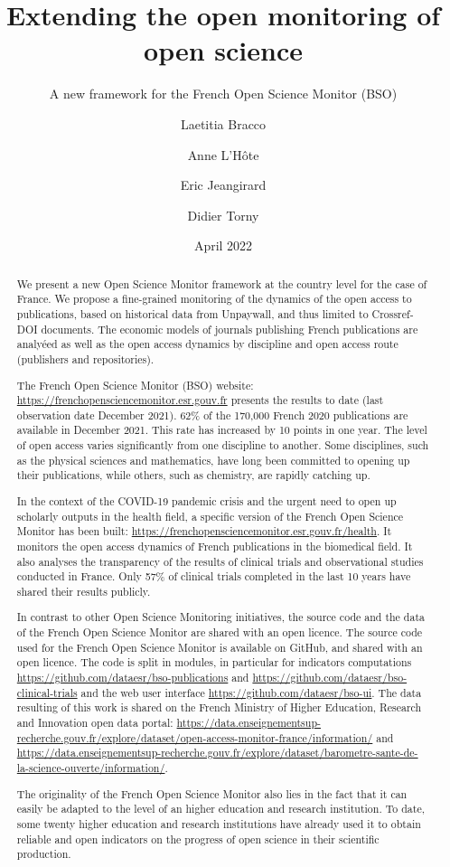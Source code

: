 \documentclass[
]{article}
\title{Extending the open monitoring of open science}
\subtitle{A new framework for the French Open Science Monitor (BSO)}
\author[%
  2%
  ]{%
  Laetitia Bracco%
}
\author[%
  1%
  ]{%
  Anne L'Hôte%
}
\author[%
  1%
  ]{%
  Eric Jeangirard%
}
\author[%
  3%
  ]{%
  Didier Torny%
}
\affil[1]{French Ministry of Higher Education, Research and Innovation,
Paris, France}
\affil[2]{University of Lorraine, France}
\affil[3]{CNRS, France}
\date{April 2022}
\begin{document}
\maketitle
\begin{abstract}
We present a new Open Science Monitor framework at the country level for
the case of France. We propose a fine-grained monitoring of the dynamics
of the open access to publications, based on historical data from
Unpaywall, and thus limited to Crossref-DOI documents. The economic
models of journals publishing French publications are analyéed as well
as the open access dynamics by discipline and open access route
(publishers and repositories).

The French Open Science Monitor (BSO) website:
\url{https://frenchopensciencemonitor.esr.gouv.fr} presents the results
to date (last observation date December 2021). 62\% of the 170,000
French 2020 publications are available in December 2021. This rate has
increased by 10 points in one year. The level of open access varies
significantly from one discipline to another. Some disciplines, such as
the physical sciences and mathematics, have long been committed to
opening up their publications, while others, such as chemistry, are
rapidly catching up.

In the context of the COVID-19 pandemic crisis and the urgent need to
open up scholarly outputs in the health field, a specific version of the
French Open Science Monitor has been built:
\url{https://frenchopensciencemonitor.esr.gouv.fr/health}. It monitors
the open access dynamics of French publications in the biomedical field.
It also analyses the transparency of the results of clinical trials and
observational studies conducted in France. Only 57\% of clinical trials
completed in the last 10 years have shared their results publicly.

In contrast to other Open Science Monitoring initiatives, the source
code and the data of the French Open Science Monitor are shared with an
open licence. The source code used for the French Open Science Monitor
is available on GitHub, and shared with an open licence. The code is
split in modules, in particular for indicators computations
\url{https://github.com/dataesr/bso-publications} and
\url{https://github.com/dataesr/bso-clinical-trials} and the web user
interface \url{https://github.com/dataesr/bso-ui}. The data resulting of
this work is shared on the French Ministry of Higher Education, Research
and Innovation open data portal:
\url{https://data.enseignementsup-recherche.gouv.fr/explore/dataset/open-access-monitor-france/information/}
and
\url{https://data.enseignementsup-recherche.gouv.fr/explore/dataset/barometre-sante-de-la-science-ouverte/information/}.

The originality of the French Open Science Monitor also lies in the fact
that it can easily be adapted to the level of an higher education and
research institution. To date, some twenty higher education and research
institutions have already used it to obtain reliable and open indicators
on the progress of open science in their scientific production.
\end{abstract}
\end{document}
